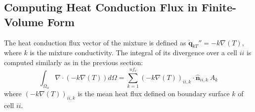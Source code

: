 \subsection{Computing Heat Conduction Flux in Finite-Volume Form}


The heat conduction flux vector of the mixture is defined as $\dot{\mathbf{q}}_{kT}''= -k \nabla(T)$, where $k$ is the mixture conductivity. The integral of its divergence over a cell $ii$ is computed similarly as in the previous section:
\begin{equation}
    \int_{\Omega_{ii}} {\nabla \cdot \left(-k \nabla(T)\right)} d\Omega = \sum_{k=1}^{nf_c} \left(-k \nabla(T) \right)_{ii,k} \cdot \hat{\mathbf{n}}_{ii,k}  \: A_k
\end{equation}
where $\left(-k \nabla(T) \right)_{ii,k}$ is the mean heat flux defined on boundary surface $k$ of cell $ii$.


